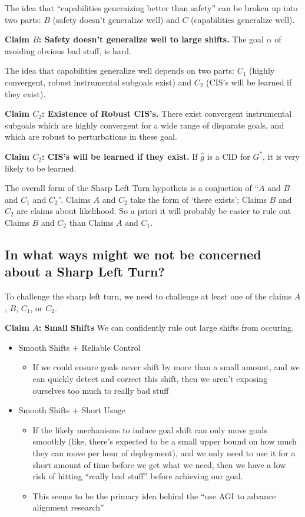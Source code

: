 \documentclass{article}
\begin{document}
The idea that ``capabilities generaizing better than safety'' can be broken up into two parts: \textbf{$B$} (safety doesn't generalize well) and \textbf{$C$} (capabilities generalize well).

\textbf{Claim $B$: Safety doesn't generalize well to large shifts.} The goal $\alpha$ of avoiding obvious bad stuff, is hard. 

The idea that capabilities generalize well depends on two parts: \textbf{$C_1$} (highly convergent, robust instrumental subgoals exist) and \textbf{$C_2$} (CIS's will be learned if they exist).

\textbf{Claim $C_2$: Existence of Robust CIS's.} There exist convergent instrumental subgoals which are highly convergent for a wide range of disparate goals, and which are robust to perturbations in these goal.

\textbf{Claim $C_2$: CIS's will be learned if they exist.} If $\hat{g}$ is a CID for $G^*$, it is very likely to be learned.

The overall form of the Sharp Left Turn hypotheis is a conjuction of ``$A$ and $B$ and $C_1$ and $C_2$''. Claims $A$ and $C_2$ take the form of `there exists'; Claims $B$ and $C_2$ are claims about likelihood. So a priori it will probably be easier to rule out Claims $B$ and $C_2$ than Claims $A$ and $C_1$.

\subsection{In what ways might we not be concerned about a Sharp Left Turn?}
To challenge the sharp left turn, we need to challenge at least one of the claims $A$, $B$, $C_1$, or $C_2$. 

\textbf{Claim $\overline{A}$: Small Shifts} We can confidently rule out large shifts from occuring.
\begin{itemize}
    \item Smooth Shifts + Reliable Control
    \begin{itemize}
        \item If we could ensure goals never shift by more than a small amount, and we can quickly detect and correct this shift, then we aren’t exposing ourselves too much to really bad stuff
    \end{itemize}
    \item Smooth Shifts + Short Usage
    \begin{itemize}
        \item If the likely mechanisms to induce goal shift can only move goals smoothly (like, there’s expected to be a small upper bound on how much they can move per hour of deployment), and we only need to use it for a short amount of time before we get what we need, then we have a low risk of hitting “really bad stuff” before achieving our goal.
        \item This seems to be the primary idea behind the “use AGI to advance alignment research”
    \end{itemize}
\end{itemize}
\end{document}
